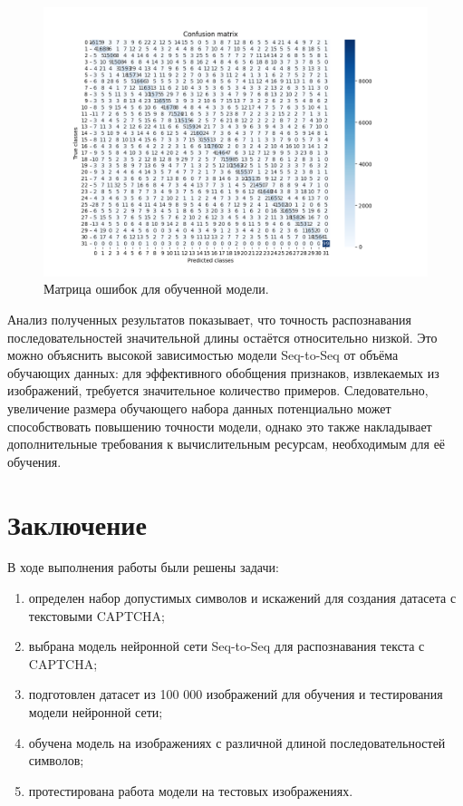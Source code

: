 \documentclass{altsu-report}
\begin{document}
\begin{figure}[H]
    \centering
    \includegraphics[width=1.1\linewidth]{imgs/Confusion_matrix.png}
    \caption{Матрица ошибок для обученной модели.}
    \label{fig:cm}
\end{figure}

Анализ полученных результатов показывает, что точность распознавания последовательностей значительной длины остаётся относительно низкой. Это можно объяснить высокой зависимостью модели Seq-to-Seq от объёма обучающих данных: для эффективного обобщения признаков, извлекаемых из изображений, требуется значительное количество примеров. Следовательно, увеличение размера обучающего набора данных потенциально может способствовать повышению точности модели, однако это также накладывает дополнительные требования к вычислительным ресурсам, необходимым для её обучения.

\chapter*{Заключение}

В ходе выполнения работы были решены задачи:
\begin{enumerate}
    \item определен набор допустимых символов и искажений для создания датасета с текстовыми CAPTCHA;
    \item выбрана модель нейронной сети Seq-to-Seq для распознавания текста с CAPTCHA;
    \item подготовлен датасет из 100 000 изображений для обучения и тестирования модели нейронной сети;
    \item обучена модель на изображениях с различной длиной последовательностей символов;
    \item протестирована работа модели на тестовых изображениях.
\end{enumerate}
\end{document}
